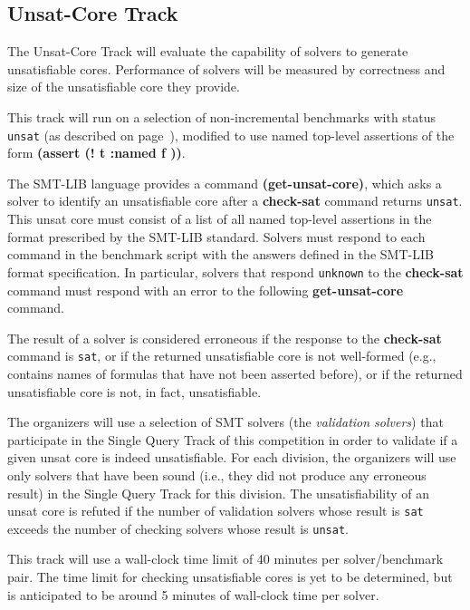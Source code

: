 \documentclass[12pt]{article}
\newcommand{\akey}[1]{\textbf{#1}\xspace}
\newcommand{\maintrack}{Single Query Track\xspace}
\newcommand{\ucoretrack}{Unsat-Core Track\xspace}
\begin{document}
\subsection{\ucoretrack}
\label{sec:exec:unsat-core}

The \ucoretrack will evaluate the capability of solvers to generate
unsatisfiable cores.  Performance of solvers will be measured by correctness
and size of the unsatisfiable core they provide.

This track will run on a selection of non-incremental benchmarks with status
\texttt{unsat} (as described on page~\pageref{benchmark-selection}), modified
to use named top-level assertions of the form \akey{(assert (! t :named f ))}.


The SMT-LIB language provides a command \akey{(get-unsat-core)}, which asks
a solver to identify an unsatisfiable core after a \akey{check-sat}
command returns \texttt{unsat}.
This unsat core must consist of a list of all named top-level
assertions in the format prescribed by the SMT-LIB standard.
%
Solvers must respond to each command in the benchmark script with the
answers defined in the SMT-LIB format specification.  In particular,
solvers that respond \texttt{unknown} to the \akey{check-sat} command
must respond with an error to the following \akey{get-unsat-core}
command.

The result of a solver is considered erroneous if the response to the
\akey{check-sat} command is \texttt{sat}, or if the returned
unsatisfiable core is not well-formed (e.g., contains names of
formulas that have not been asserted before), or if the returned
unsatisfiable core is not, in fact, unsatisfiable.

The organizers will use a selection of SMT solvers (the \emph{validation
solvers}) that participate in the \maintrack of this competition in order to
validate if a given unsat core is indeed unsatisfiable.  For each division, the
organizers will use only solvers that have been sound (i.e., they did not
produce any erroneous result) in the \maintrack for this division.  The
unsatisfiability of an unsat core is refuted if the number of validation
solvers whose result is \texttt{sat} exceeds the number of checking solvers
whose result is \texttt{unsat}.

This track will use a wall-clock time limit of 40 minutes per solver/benchmark
pair. The time limit for checking unsatisfiable cores is yet to be determined,
but is anticipated to be around 5 minutes of wall-clock time per solver.
\end{document}
